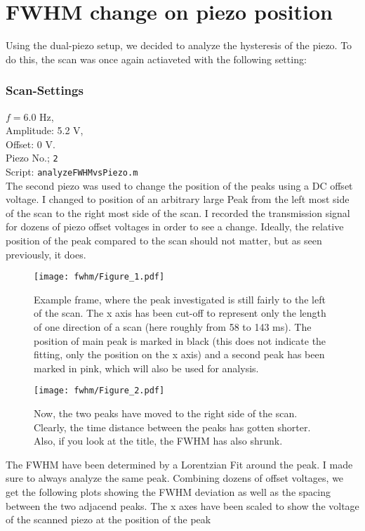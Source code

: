 \section{FWHM change on piezo position}
Using the dual-piezo setup, we decided to analyze the hysteresis of the piezo. To do this, the scan was once again actiaveted with the following setting:
\subsubsection*{Scan-Settings}
$f = 6.0$ Hz,  \\
Amplitude: 5.2 V,  \\
Offset: 0 V.  \\
Piezo No.; \texttt{2}  \\
Script: \texttt{analyzeFWHMvsPiezo.m} \\

The second piezo was used to change the position of the peaks using a DC offset voltage.
I changed to position of an arbitrary large Peak from the left most side of the scan to the right most side of the scan. I recorded the transmission signal for dozens of piezo offset voltages in order to see a change. Ideally, the relative position of the peak compared to the scan should not matter, but as seen previously, it does. 


\begin{figure}[H]
    \centering
    \texttt{[image: fwhm/Figure\_1.pdf]}
    \caption{Example frame, where the peak investigated is still fairly to the left of the scan. The x axis has been cut-off to represent only the length of one direction of a scan (here roughly from 58 to 143 ms). The position of main peak is marked in black (this does not indicate the fitting, only the position on the x axis) and a second peak has been marked in pink, which will also be used for analysis.}
\end{figure}


\begin{figure}[H]
    \centering
    \texttt{[image: fwhm/Figure\_2.pdf]}
    \caption{Now, the two peaks have moved to the right side of the scan. Clearly, the time distance between the peaks has gotten shorter. Also, if you look at the title, the FWHM has also shrunk.}
\end{figure}

The FWHM have been determined by a Lorentzian Fit around the peak. I made sure to always analyze the same peak. Combining dozens of offset voltages, we get the following plots showing the FWHM deviation as well as the spacing between the two adjacend peaks. The x axes have been scaled to show the voltage of the scanned piezo at the position of the peak


